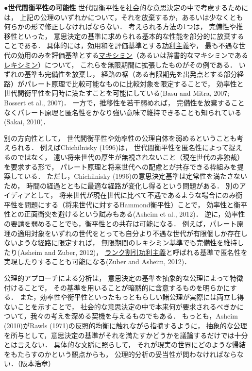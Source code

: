 \documentclass[11pt,a4paper]{article}
\begin{document}
\noindent\textbf{●世代間衡平性の可能性}\hspace{0.5em}
世代間衡平性を社会的な意思決定の中で考慮するためには，
上記の公理のいずれかについて，それを放棄するか，あるいは少なくとも何らかの形で修正しなければならない．
考えられる方法の1つは，
完備性や推移性といった，
意思決定の基準に求められる基本的な性能を部分的に放棄することである．
具体的には，効用和を評価基準とする\underline{功利主義}や，
最も不遇な世代の効用のみを評価基準とする\underline{マキシミン}（あるいは辞書的なマキシミンである\underline{レキシミン}）について，%
これらを無限期間に拡張したものがその例である．
いずれの基準も完備性を放棄し，
経路の裾（ある有限期先を出発点とする部分経路）がパレート原理で比較可能なものに比較対象を限定することで，
効率性と世代間衡平性を同時に満たすことを可能にしている(Basu and Mitra, 2007; Bossert et al., 2007)．
一方で，推移性を若干弱めれば，
完備性を放棄することなくパレート原理と匿名性をかなり強い意味で維持できることも知られている(Sakai, 2010)．

別の方向性として，
世代間衡平性や効率性の公理自体を弱めるということも考えられる．
例えばChichilnisky (1996)は，
世代間衡平性を匿名性によって捉えるのではなく，
遠い将来世代の厚生が無視されないこと（現在世代の非独裁）を要求する形で，
パレート原理と将来世代への配慮とが共存できる枠組みを提案している．
ただし，Chichilnisky (1996)の意思決定基準は定常性を満たさないため，
時間の経過とともに最適な経路が変化し得るという問題がある．
別のアイディアとして，
将来世代が現在世代に比べて不遇であるような場合にのみ衡平性を問題にする（将来世代に対するHammond衡平性）ことで，
効率性と衡平性との正面衝突を避けるという試みもある(Asheim et al., 2012)．
逆に，効率性の要請を弱めることでも，衡平性との共存は可能になる．
例えば，パレート原理の適用対象をいずれの世代をとっても自分より不遇な世代が有限個しか存在しないような経路に限定すれば，
無限期間のレキシミン基準でも完備性を維持したり(Asheim and Zuber, 2012)，
\underline{ランク割引功利主義}と呼ばれる基準で匿名性を実現したりすることも可能になる(Zuber and Asheim, 2012)．

公理的アプローチによる分析は，
意思決定の基準を抽象的な公理によって特徴付けることで，
その基準を用いることが暗黙的に含意するものを明らかにする．
また，効率性や衡平性といったもっともらしい諸公理が実際には両立し得ないことを示すことで，
社会的な意思決定の中で本来何が要求されるべきかについて，我々の考えを深める契機を与えるものでもある．
もっとも，Asheim (2010)がRawls (1971)の\underline{反照的均衡}に触れながら指摘するように，
抽象的な公理を所与として，意思決定の基準がそれを満たすかどうかを議論するだけでは十分とは言えない．
具体的な文脈に照らして，
それが現実の世界にどのような帰結をもたらすのかという観点からも，
公理的分析の妥当性が問わなければならない．（阪本浩章）
\end{document}

